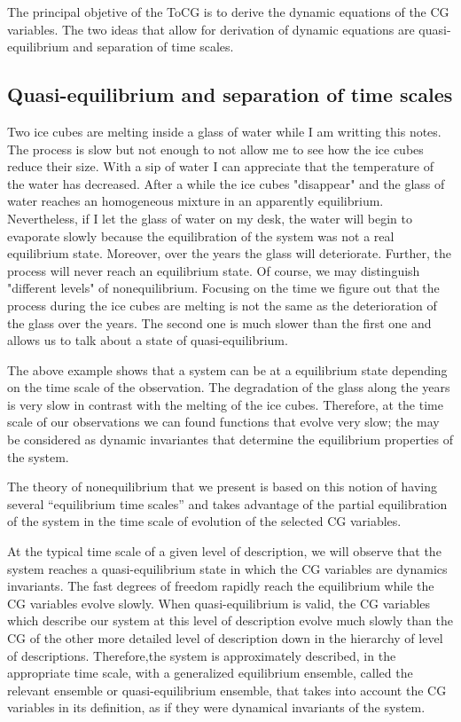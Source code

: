 \documentclass[a4paper,openright,12pt]{book}
\begin{document}
The principal objetive of the ToCG is to derive the dynamic equations of the CG variables. The two ideas that allow for derivation of dynamic equations are quasi-equilibrium and separation of time scales.

\subsection{Quasi-equilibrium and separation of time scales}
Two ice cubes are melting inside a glass of water while I am writting this notes. 
The process is slow but not enough to not allow me to see how the ice cubes reduce their size. 
With a sip of water I can appreciate that the temperature of the water has decreased. 
After a while the ice cubes "disappear" and the glass of water reaches an homogeneous mixture in an apparently equilibrium. 
Nevertheless, if I let the glass of water on my desk, the water will begin to evaporate slowly because the equilibration of the system was not a real equilibrium state. 
Moreover, over the years the glass will deteriorate. 
Further, the process will never reach an equilibrium state.
Of course, we may distinguish "different levels" of nonequilibrium. 
Focusing on the time we figure out that the process during the ice cubes are melting is not the same as the deterioration of the glass over the years. The second one is much slower than the first one and allows us to talk about a state of quasi-equilibrium. 

The above example shows that a system can be at a equilibrium state depending on the time scale of the observation. The degradation of the glass along the years is very slow in contrast with the melting of the ice cubes. Therefore, at the time scale of our observations we can found functions that evolve very slow; the may be considered as dynamic invariantes that determine the equilibrium properties of the system. 

The theory of nonequilibrium that we present is based on this notion of
having several “equilibrium time scales” and takes advantage of the partial equilibration of
the system in the time scale of evolution of the selected CG variables.

At the typical time scale of a given level of description, we will observe that the system reaches a quasi-equilibrium state in which the CG variables are dynamics invariants. 
The fast degrees of freedom rapidly reach the equilibrium while the CG variables evolve slowly. 
When quasi-equilibrium is valid, the CG variables which describe our system at this level of description evolve much slowly than the CG of the other more detailed level of description down in the hierarchy of level of descriptions. 
Therefore,the system is approximately described, in the appropriate time scale, with a generalized equilibrium ensemble, called the relevant ensemble or quasi-equilibrium ensemble, that takes into account the CG variables in its definition, as if they were dynamical invariants of the system.
\end{document}
